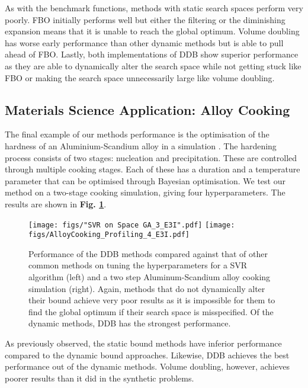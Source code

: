 \documentclass[preprint]{elsarticle}
\begin{document}
As with the benchmark functions, methods with static search spaces perform very poorly. FBO initially performs well but either the filtering or the diminishing expansion means that it is unable to reach the global optimum. Volume doubling has worse early performance than other dynamic methods but is able to pull ahead of FBO. Lastly, both implementations of DDB show superior performance as they are able to dynamically alter the search space while not getting stuck like FBO or making the search space unnecessarily large like volume doubling.


\subsection{Materials Science Application: Alloy Cooking}
The final example of our methods performance is the optimisation of the hardness of an Aluminium-Scandium alloy in a simulation \cite{robson2003extension}. The hardening process consists of two stages: nucleation and precipitation. These are controlled through multiple cooking stages. Each of these has a duration and a temperature parameter that can be optimised through Bayesian optimisation. We test our method on a two-stage cooking simulation, giving four hyperparameters. The results are shown in\textbf{ Fig. \ref{fig:real_exp}}. 

\begin{figure}
\centering
\texttt{[image: figs/"SVR on Space GA\_3\_E3I".pdf]}
\texttt{[image: figs/AlloyCooking\_Profiling\_4\_E3I.pdf]}
\caption{Performance of the DDB methods compared against that of other common methods on tuning the hyperparameters for a SVR algorithm (left) and a two step Aluminum-Scandium alloy cooking simulation (right). Again, methods that do not dynamically alter their bound achieve very poor results as it is impossible for them to find the global optimum if their search space is misspecified. Of the dynamic methods, DDB has the strongest performance. \label{fig:real_exp}}
\end{figure}

As previously observed, the static bound methods have inferior performance compared to the dynamic bound approaches. Likewise, DDB achieves the best performance out of the dynamic methods. Volume doubling, however, achieves poorer results than it did in the synthetic problems.
\end{document}
